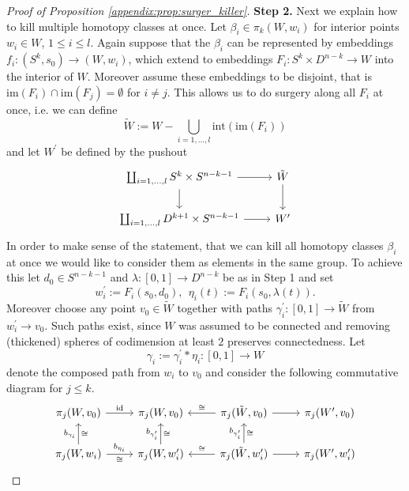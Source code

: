 \begin{proof}[Proof of Proposition \ref{appendix:prop:surger_killer}]
    \noindent \textbf{Step 2.} Next we explain how to kill multiple homotopy classes at once. Let $\beta_i \in \pi_k(W,w_i)$ for interior points $w_i \in W$, $1 \leq i \leq l$. Again suppose that the $\beta_i$ can be represented by embeddings $f_i \colon (S^k,s_0) \to (W,w_i)$, which extend to embeddings $F_i \colon S^k \times D^{n-k} \to W$ into the interior of $W$. Moreover assume these embeddings to be disjoint, that is $\mathrm{im}(F_i) \cap \mathrm{im}(F_j) = \emptyset$ for $i \neq j$. This allows us to do surgery along all $F_i$ at once, i.e. we can define 
    \[
    \tilde{W} := W - \bigcup_{i=1,\ldots,l} \mathrm{int}(\mathrm{im}(F_i))
    \]
    and let $W^\prime$ be defined by the pushout 
    \[\begin{tikzcd}
	{\coprod_{i=1,\ldots,l} S^k \times S^{n-k-1}} & {\tilde{W}} \\
	{\coprod_{i=1,\ldots,l}D^{k+1} \times S^{n-k-1}} & {W^\prime}
	\arrow[from=1-1, to=1-2]
	\arrow[from=1-1, to=2-1]
	\arrow[from=1-2, to=2-2]
	\arrow[from=2-1, to=2-2]
    \end{tikzcd}\]
    In order to make sense of the statement, that we can kill all homotopy classes $\beta_i$ at once we would like to consider them as elements in the same group. To achieve this let $d_0 \in S^{n-k-1}$ and $\lambda \colon [0,1] \to D^{n-k}$ be as in Step 1 and set 
    \[
    w_i^\prime := F_i(s_0,d_0), \; \, \eta_i(t) := F_i(s_0,\lambda(t)).
    \]
    Moreover choose any point $v_0 \in \tilde{W}$ together with paths $\gamma_i^\prime \colon [0,1] \to \tilde{W}$ from $w_i^\prime \to v_0$. Such paths exist, since $W$ was assumed to be connected and removing (thickened) spheres of codimension at least $2$ preserves connectedness. Let 
    \[
    \gamma_i := \gamma_i^\prime \ast \eta_i \colon [0,1] \to W
    \]
    denote the composed path from $w_i$ to $v_0$ and consider the following commutative diagram for $j \leq k$.
    \[\begin{tikzcd}
	{\pi_j(W,v_0)} & {\pi_j(W,v_0)} & {\pi_j(\tilde{W},v_0)} & {\pi_j(W^\prime,v_0)} \\
	{\pi_j(W,w_i)} & {\pi_j(W,w_i^\prime)} & {\pi_j(\tilde{W},w_i^\prime)} & {\pi_j(W^\prime,w_i^\prime)}
	\arrow["{\mathrm{id}}", from=1-1, to=1-2]
	\arrow["\cong"', from=1-3, to=1-2]
	\arrow[from=1-3, to=1-4]
	\arrow["{b_{\gamma_i}}", "\cong"', from=2-1, to=1-1]
	\arrow["{b_{\eta_i}}", "\cong"', from=2-1, to=2-2]
	\arrow["{b_{\gamma^\prime_i}}", "\cong"', from=2-2, to=1-2]
	\arrow["{b_{\gamma^\prime_i}}", "\cong"', from=2-3, to=1-3]
	\arrow["\cong"', from=2-3, to=2-2]
	\arrow[from=2-3, to=2-4]

\end{tikzcd}\]
\end{proof}
